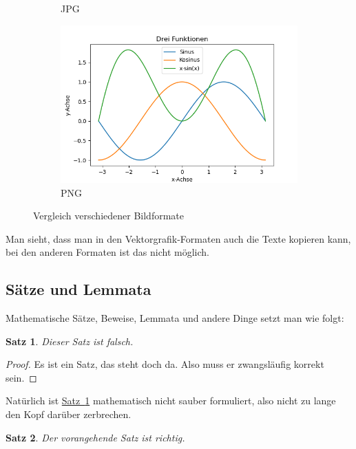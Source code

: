 \documentclass[12pt]{article}
\newtheorem{theorem}{Satz}[section]
\theoremstyle{definition}
\numberwithin{equation}{section}
\begin{document}
\begin{figure}[htb]
\begin{subfigure}[t]{.49\textwidth}
    \caption{JPG}
    \label{Abb:JPG}
  \end{subfigure}
  \begin{subfigure}[t]{.49\textwidth}
    \centering
    \includegraphics[width=\textwidth]{python/Bild.png}
    \caption{PNG}
    \label{Abb:PNG}
  \end{subfigure}  
  \caption{Vergleich verschiedener Bildformate}
  \label{Abb:Bildformate}
\end{figure}
Man sieht, dass man in den Vektorgrafik-Formaten auch die Texte
kopieren kann, bei den anderen Formaten ist das nicht möglich.

\subsection{Sätze und Lemmata}
\label{sec:Saetze_und_Lemmata}

Mathematische Sätze, Beweise, Lemmata und andere Dinge setzt man wie
folgt:
\begin{theorem}
  \label{theo:Wers_glaubt}
  Dieser Satz ist falsch.
\end{theorem}

\begin{proof}
  Es ist ein Satz, das steht doch da. Also muss er zwangsläufig
  korrekt sein.
\end{proof}

Natürlich ist
\hyperref[theo:Wers_glaubt]{Satz~\ref*{theo:Wers_glaubt}} mathematisch
nicht sauber formuliert, also nicht zu lange den Kopf darüber
zerbrechen.

\begin{theorem}
  Der vorangehende Satz ist richtig.
\end{theorem}
\end{document}

